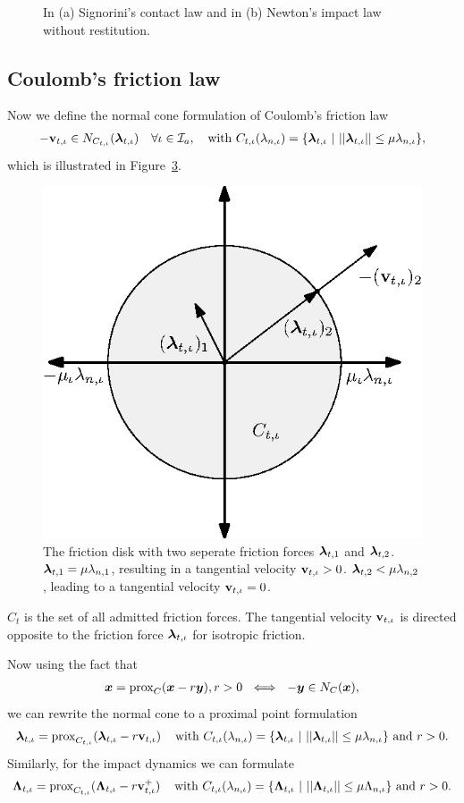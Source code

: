 \documentclass[../DC2019003Bouma.tex]{subfiles}
\begin{document}
\begin{figure}[bt!]
\begin{subfigure}{0.3\textwidth}
\caption{}\label{fig:appnewtonimpact}
\end{subfigure}
\caption{In \textnormal{(a)} Signorini's contact law and in \textnormal{(b)} Newton's impact law without restitution.}
\end{figure}

\subsection{Coulomb's friction law}
Now we define the normal cone formulation of Coulomb's friction law
\begin{align}
-\mathbf{v}_{t,\iota} \in N_{C_{t,\iota}}(\boldsymbol{\lambda}_{t,\iota})\quad \forall \iota\in\mathcal{I}_a,\quad \text{with }C_{t,\iota}(\lambda_{n,\iota}) = \{\boldsymbol{\lambda}_{t,\iota}\ |\ ||\boldsymbol{\lambda}_{t,\iota}|| \leq \mu\lambda_{n,\iota}\},
\end{align}
which is illustrated in Figure~\ref{fig:appfrictiondisk}.  

\begin{figure}[h]
\centering
\includegraphics[width=.4\textwidth]{frictiondisk.eps}\caption{The friction disk with two seperate friction forces $\boldsymbol{\lambda}_{t,1}$ and $\boldsymbol{\lambda}_{t,2}$. $\boldsymbol{\lambda}_{t,1} = \mu\lambda_{n,1}$, resulting in a tangential velocity $\mathbf{v}_{t,\iota}>0$. $\boldsymbol{\lambda}_{t,2}<\mu\lambda_{n,2}$, leading to a tangential velocity $\mathbf{v}_{t,\iota}=0$.}\label{fig:appfrictiondisk}
\end{figure}

$C_t$ is the set of all admitted friction forces. The tangential velocity $\mathbf{v}_{t,\iota}$ is directed opposite to the friction force $\boldsymbol{\lambda}_{t,\iota}$ for isotropic friction. 

Now using the fact that
\begin{align}
{\boldsymbol{x}} = \operatorname{\text{prox}}_C({\boldsymbol{x}} -r{\boldsymbol{y}}), r > 0\ \iff\ -{\boldsymbol{y}}\in N_C({\boldsymbol{x}}),
\end{align}
we can rewrite the normal cone to a proximal point formulation
\begin{align}
\boldsymbol{\lambda}_{t,\iota} = \operatorname{\text{prox}}_{C_{t,\iota}}(\boldsymbol{\lambda}_{t,\iota} - r\mathbf{v}_{t,\iota})\,\quad\text{with }C_{t,\iota}(\lambda_{n,\iota}) = \{\boldsymbol{\lambda}_{t,\iota}\ |\ ||\boldsymbol{\lambda}_{t,\iota}|| \leq \mu\lambda_{n,\iota}\}\text{ and }r>0.
\end{align}
Similarly, for the impact dynamics we can formulate
\begin{align}
\boldsymbol{\Lambda}_{t,\iota} = \operatorname{\text{prox}}_{C_{t,\iota}}(\boldsymbol{\Lambda}_{t,\iota} - r\mathbf{v}^+_{t,\iota})\,\quad \text{with }C_{t,\iota}(\lambda_{n,\iota}) = \{\boldsymbol{\Lambda}_{t,\iota}\ |\ ||\boldsymbol{\Lambda}_{t,\iota}|| \leq \mu\Lambda_{n,\iota}\}\text{ and }r>0.
\end{align}
\end{document}
